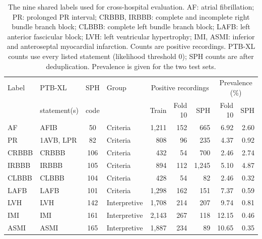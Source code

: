 \documentclass[preprint,12pt]{elsarticle}
\begin{document}
\begin{table}[t]
\centering
\caption{The nine shared labels used for cross-hospital evaluation. AF: atrial fibrillation; PR: prolonged PR interval; CRBBB, IRBBB: complete and incomplete right bundle branch block; CLBBB: complete left bundle branch block; LAFB: left anterior fascicular block; LVH: left ventricular hypertrophy; IMI, ASMI: inferior and anteroseptal myocardial infarction. Counts are positive recordings. PTB-XL counts use every listed statement (likelihood threshold 0); SPH counts are after deduplication. Prevalence is given for the two test sets.}
\label{tab:labels}
\footnotesize
\setlength{\tabcolsep}{4pt}
\begin{tabular}{llclrrrrr}
\toprule
Label & PTB-XL & SPH & Group & \multicolumn{3}{c}{Positive recordings} & \multicolumn{2}{c}{Prevalence (\%)} \\
      & statement(s) & code & & Train & Fold 10 & SPH & Fold 10 & SPH \\
\midrule
AF    & AFIB      & 50  & Criteria     & 1,211 & 152 & 665   & 6.92  & 2.60 \\
PR    & 1AVB, LPR & 82  & Criteria     & 808   & 96  & 235   & 4.37  & 0.92 \\
CRBBB & CRBBB     & 106 & Criteria     & 432   & 54  & 700   & 2.46  & 2.74 \\
IRBBB & IRBBB     & 105 & Criteria     & 894   & 112 & 1,245 & 5.10  & 4.87 \\
CLBBB & CLBBB     & 104 & Criteria     & 428   & 54  & 82    & 2.46  & 0.32 \\
LAFB  & LAFB      & 101 & Criteria     & 1,298 & 162 & 151   & 7.37  & 0.59 \\
LVH   & LVH       & 142 & Interpretive & 1,708 & 214 & 207   & 9.74  & 0.81 \\
IMI   & IMI       & 161 & Interpretive & 2,143 & 267 & 118   & 12.15 & 0.46 \\
ASMI  & ASMI      & 165 & Interpretive & 1,887 & 234 & 89    & 10.65 & 0.35 \\
\bottomrule
\end{tabular}
\end{table}
\end{document}

